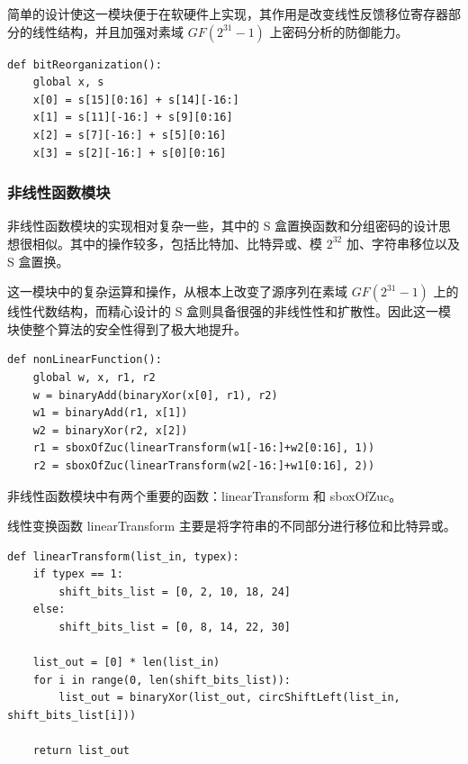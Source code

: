 简单的设计使这一模块便于在软硬件上实现，其作用是改变线性反馈移位寄存器部分的线性结构，并且加强对素域 $GF(2^{31}-1)$ 上密码分析的防御能力。 \cite{zuc_feng}

\newpage

\begin{lstlisting}[style=myPython,label={lst:bitreorganization},caption={比特重组}]
def bitReorganization():
    global x, s
    x[0] = s[15][0:16] + s[14][-16:]
    x[1] = s[11][-16:] + s[9][0:16]
    x[2] = s[7][-16:] + s[5][0:16]
    x[3] = s[2][-16:] + s[0][0:16]
\end{lstlisting}


\subsubsection{非线性函数模块}
非线性函数模块的实现相对复杂一些，其中的 S 盒置换函数和分组密码的设计思想很相似。其中的操作较多，包括比特加、比特异或、模 $2^{32}$ 加、字符串移位以及 S 盒置换。

这一模块中的复杂运算和操作，从根本上改变了源序列在素域 $GF(2^{31}-1)$ 上的线性代数结构，而精心设计的 S 盒则具备很强的非线性性和扩散性。因此这一模块使整个算法的安全性得到了极大地提升。 \cite{zuc_feng}

\begin{lstlisting}[style=myPython,label={lst:nonlinearfunction},caption={非线性函数}]
def nonLinearFunction():
    global w, x, r1, r2
    w = binaryAdd(binaryXor(x[0], r1), r2)
    w1 = binaryAdd(r1, x[1])
    w2 = binaryXor(r2, x[2])
    r1 = sboxOfZuc(linearTransform(w1[-16:]+w2[0:16], 1))
    r2 = sboxOfZuc(linearTransform(w2[-16:]+w1[0:16], 2))
\end{lstlisting}

\vspace*{0.5\baselineskip}
非线性函数模块中有两个重要的函数：{\cnsls linearTransform} 和 {\cnsls sboxOfZuc}。

\vspace*{0.5\baselineskip}
线性变换函数 { \cnsls linearTransform} 主要是将字符串的不同部分进行移位和比特异或。

\begin{lstlisting}[style=myPython,label={lst:lineartransform},caption={线性变换函数}]
def linearTransform(list_in, typex):
    if typex == 1:
        shift_bits_list = [0, 2, 10, 18, 24]
    else:
        shift_bits_list = [0, 8, 14, 22, 30]

    list_out = [0] * len(list_in)
    for i in range(0, len(shift_bits_list)):
        list_out = binaryXor(list_out, circShiftLeft(list_in, shift_bits_list[i]))

    return list_out
\end{lstlisting}

